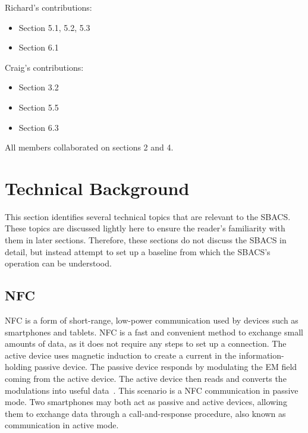 \documentclass[12pt]{report}
\let\Oldsection\section
\renewcommand{\section}{\FloatBarrier\Oldsection}
\begin{document}
Richard's contributions:
\begin{itemize}
\item Section 5.1, 5.2, 5.3
\item Section 6.1
\end{itemize}

Craig's contributions:
\begin{itemize}
\item Section 3.2
\item Section 5.5
\item Section 6.3
\end{itemize}

All members collaborated on sections 2 and 4.


\chapter{Technical Background} \label{technical-background}

This section identifies several technical topics that are relevant to the SBACS. These topics are discussed lightly here
to ensure the reader's familiarity with them in later sections. Therefore, these sections do not discuss the SBACS in
detail, but instead attempt to set up a baseline from which the SBACS's operation can be understood.


\section{NFC} \label{nfc}

NFC is a form of short-range, low-power communication used by devices such as smartphones and tablets. NFC is a fast
and convenient method to exchange small amounts of data, as it does not require any steps to set up a connection. The 
active device uses magnetic induction to create a current in the information-holding passive device. The
passive device responds by modulating the EM field coming from the active device. The active device then reads and
converts the modulations into useful data~\autocite{NFCORG}. This scenario is a NFC communication in passive mode. Two
smartphones may both act as passive and active devices, allowing them to exchange data through a call-and-response procedure,
also known as communication in active mode.
\end{document}
